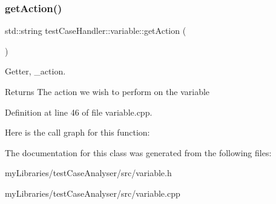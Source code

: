 \subsubsection{\texorpdfstring{getAction()}{getAction()}}
{\footnotesize\ttfamily std\+::string test\+Case\+Handler\+::variable\+::get\+Action (\begin{DoxyParamCaption}{ }\end{DoxyParamCaption})}



Getter, \+\_\+action. 

\begin{DoxyReturn}{Returns}
The action we wish to perform on the variable 
\end{DoxyReturn}


Definition at line 46 of file variable.\+cpp.

Here is the call graph for this function\+:


The documentation for this class was generated from the following files\+:\begin{DoxyCompactItemize}
\item 
my\+Libraries/test\+Case\+Analyser/src/variable.\+h\item 
my\+Libraries/test\+Case\+Analyser/src/variable.\+cpp\end{DoxyCompactItemize}
